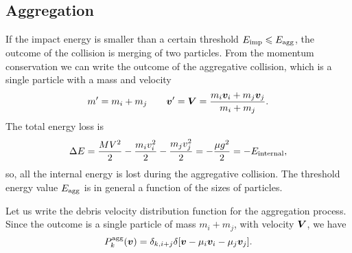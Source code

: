 \documentclass[aps,prl,preprint,groupedaddress,10pt]{revtex4-2}
\begin{document}
\subsection{Aggregation}
If the impact energy is smaller than a certain threshold 
$E_{\mathrm{imp}}\leqslant E_{\mathrm{agg}}$, the outcome of the collision is merging of two 
particles. From the momentum conservation we can write the outcome of the aggregative 
collision, which is a single particle with a mass and velocity
\begin{equation}
    m'=m_i+m_j\qquad\vb*{v}'=\vb*{V}=\frac{m_i\vb*{v}_i+m_j\vb*{v}_j}{m_i+m_j}.
\end{equation}
The total energy loss is 
\begin{equation}    
        \Delta E=\frac{MV^2}{2}-\frac{m_iv_i^2}{2}-\frac{m_jv_j^2}{2}
        =-\frac{\mu g^2}{2}=-E_{\mathrm{internal}},
\end{equation}
so, all the internal energy is lost during the aggregative collision.
The threshold energy value $E_{\mathrm{agg}}$ is in general a function of the sizes of 
particles.

Let us write the debris velocity distribution function for the aggregation process. 
Since the outcome is a single particle of mass $m_i+m_j$, with velocity $\vb*{V}$, we have
\begin{equation}
    \utx{P_k}{agg}\pqty{\bv}=\delta_{k,i+j}\delta\bqty{\bv-\mu_i\bv_i-\mu_j\bv_j}.
\end{equation}
\end{document}
